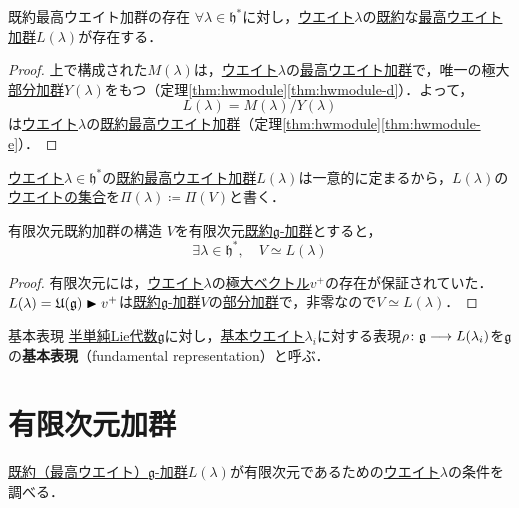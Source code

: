 \documentclass[rep_main]{subfiles}
\begin{document}
\begin{mytheo}[label=thm:hwmodule-exist]{既約最高ウエイト加群の存在}
	$\forall \lambda \in \mathfrak{h}^*$に対し，\hyperref[def:weight-rep]{ウエイト}$\lambda$の\hyperref[def:irr]{既約}な\hyperref[def:highest-weight-module]{最高ウエイト加群}$L(\lambda)$が存在する．
\end{mytheo}
\begin{proof}
	上で構成された$M(\lambda)$は，\hyperref[def:weight-rep]{ウエイト}$\lambda$の\hyperref[def:highest-weight-module]{最高ウエイト加群}で，唯一の極大\hyperref[def:sub-g-module]{部分加群}$Y(\lambda)$をもつ（定理\ref{thm:hwmodule}\ref{thm:hwmodule-d}）．よって，
	\begin{equation}
		L(\lambda) = M(\lambda) / Y(\lambda)
	\end{equation}
	は\hyperref[def:weight-rep]{ウエイト}$\lambda$の\hyperref[def:irr]{既約}\hyperref[def:highest-weight-module]{最高ウエイト加群}（定理\ref{thm:hwmodule}\ref{thm:hwmodule-e}）．
\end{proof}
\hyperref[def:weight-rep]{ウエイト}$\lambda \in \mathfrak{h}^*$の\hyperref[thm:hwmodule-exist]{既約最高ウエイト加群}$L(\lambda)$は一意的に定まるから，$L(\lambda)$の\hyperref[def:weight-rep]{ウエイトの集合}を$\Pi(\lambda) \coloneqq \Pi(V)$と書く．
\begin{mytheo}[label=thm:finite-irr-mod]{有限次元既約加群の構造}
	$V$を有限次元\hyperref[def:irr]{既約$\mathfrak{g}$-加群}とすると，
	\begin{equation}
		\exists \lambda \in \mathfrak{h}^*,\quad  V \simeq L(\lambda)
	\end{equation}
\end{mytheo}
\begin{proof}
	有限次元には，\hyperref[def:weight-rep]{ウエイト}$\lambda$の\hyperref[def:maximal-vector-rep]{極大ベクトル}$v^+$の存在が保証されていた．$L(\lambda) = \mathfrak{U}(\mathfrak{g}) \blacktriangleright v^+$は\hyperref[def:irr]{既約$\mathfrak{g}$-加群}$V$の\hyperref[def:sub-g-module]{部分加群}で，非零なので$V \simeq L(\lambda)$．
\end{proof}
\begin{mydef}[label=def:fundamental-rep]{基本表現}
	\hyperref[def:semisimple-LieAlg]{半単純Lie代数}$\mathfrak{g}$に対し，\hyperref[def:fundamental-weight]{基本ウエイト}$\lambda_i$に対する表現$\rho \colon \mathfrak{g} \longrightarrow L(\lambda_i)$を$\mathfrak{g}$の\textbf{基本表現}（fundamental representation）と呼ぶ．
\end{mydef}

\section{有限次元加群}
\hyperref[thm:hwmodule-exist]{既約（最高ウエイト）$\mathfrak{g}$-加群}$L(\lambda)$が有限次元であるための\hyperref[def:weight-rep]{ウエイト}$\lambda$の条件を調べる．
\end{document}
